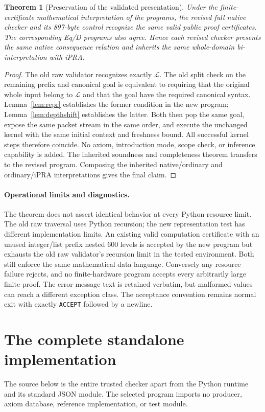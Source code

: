 \documentclass[11pt,letterpaper]{article}
\newtheorem{theorem}{Theorem}[section]
\theoremstyle{definition}
\theoremstyle{remark}
\begin{document}
\begin{theorem}[Preservation of the validated presentation]
\label{thm:preservation}
Under the finite-certificate mathematical interpretation of the programs,
the revised full native checker and its 897-byte control recognize the
same valid public proof certificates. The corresponding Eq/D programs
also agree. Hence each revised checker presents the same native consequence
relation and inherits the same whole-domain bi-interpretation with iPRA.
\end{theorem}
\begin{proof}
The old raw validator recognizes exactly $\mathcal L$. The old split check
on the remaining prefix and canonical goal is equivalent to requiring that
the original whole input belong to $\mathcal L$ and that the goal have the
required canonical syntax. Lemma~\ref{lem:repr} establishes the former
condition in the new program; Lemma~\ref{lem:depthshift} establishes the
latter. Both then pop the same goal, expose the same packet stream in the
same order, and execute the unchanged kernel with the same initial context
and freshness bound. All successful kernel steps therefore coincide.
No axiom, introduction mode, scope check, or inference capability is added.
The inherited soundness and completeness theorem transfers to the revised
program. Composing the inherited native/ordinary and ordinary/iPRA
interpretations gives the final claim.
\end{proof}

\paragraph{Operational limits and diagnostics.}
The theorem does not assert identical behavior at every Python resource
limit. The old raw traversal uses Python recursion; the new representation
test has different implementation limits. An existing valid computation
certificate with an unused integer/list prefix nested 600 levels is accepted
by the new program but exhausts the old raw validator's recursion limit in
the tested environment. Both still enforce the same mathematical data
language. Conversely any resource failure rejects, and no finite-hardware
program accepts every arbitrarily large finite proof. The error-message
text is retained verbatim, but malformed values can reach a different
exception class. The acceptance convention remains normal exit with exactly
\texttt{ACCEPT} followed by a newline.

\clearpage
\section{The complete standalone implementation}
\label{sec:implementation}
The source below is the entire trusted checker apart from the Python runtime
and its standard JSON module. The selected program imports no producer,
axiom database, reference implementation, or test module.

\end{document}
